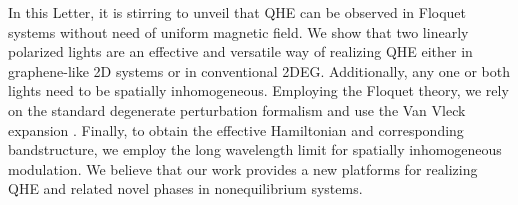 In this Letter, it is stirring to unveil that QHE can be observed in Floquet systems without need of uniform magnetic field. We show that two linearly polarized lights are an effective and versatile way of realizing QHE either in graphene-like 2D systems or in conventional 2DEG. Additionally, any one or both lights need to be spatially inhomogeneous. Employing the Floquet theory, we rely on the standard degenerate perturbation formalism and use the Van Vleck expansion \cite{MBL, supp, AEE}. Finally, to obtain the effective Hamiltonian and corresponding bandstructure, we employ the long wavelength limit for spatially inhomogeneous modulation. We believe that our work provides a new platforms for realizing QHE and related novel phases in nonequilibrium systems.

